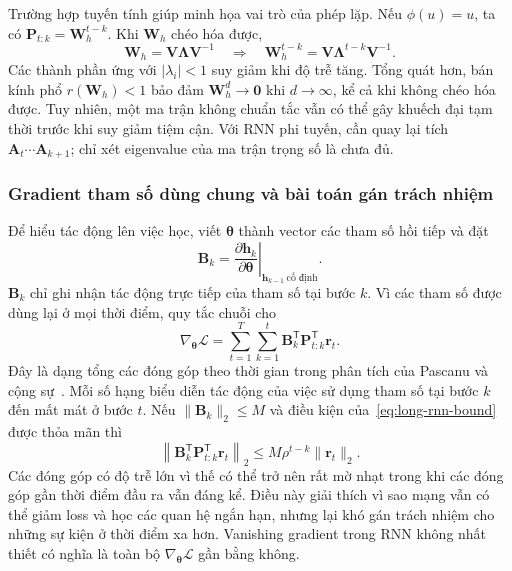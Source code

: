 \documentclass[12pt]{article}
\begin{document}
Trường hợp tuyến tính giúp minh họa vai trò của phép lặp. Nếu $\phi(u)=u$, ta có $\mathbf P_{t:k}=\mathbf W_h^{t-k}$. Khi $\mathbf W_h$ chéo hóa được,
\begin{equation}
 \mathbf W_h=\mathbf V\boldsymbol\Lambda\mathbf V^{-1}
 \quad\Longrightarrow\quad
 \mathbf W_h^{t-k}=\mathbf V\boldsymbol\Lambda^{t-k}\mathbf V^{-1}.
 \label{eq:long-rnn-eigen}
\end{equation}
Các thành phần ứng với $|\lambda_i|<1$ suy giảm khi độ trễ tăng. Tổng quát hơn, bán kính phổ $r(\mathbf W_h)<1$ bảo đảm $\mathbf W_h^d\to\mathbf0$ khi $d\to\infty$, kể cả khi không chéo hóa được. Tuy nhiên, một ma trận không chuẩn tắc vẫn có thể gây khuếch đại tạm thời trước khi suy giảm tiệm cận. Với RNN phi tuyến, cần quay lại tích $\mathbf A_t\cdots\mathbf A_{k+1}$; chỉ xét eigenvalue của ma trận trọng số là chưa đủ.

\subsubsection{Gradient tham số dùng chung và bài toán gán trách nhiệm}
Để hiểu tác động lên việc học, viết $\boldsymbol\theta$ thành vector các tham số hồi tiếp và đặt
\begin{equation}
 \mathbf B_k=\left.\frac{\partial\mathbf h_k}{\partial\boldsymbol\theta}
 \right|_{\mathbf h_{k-1}\ \text{cố định}}.
 \label{eq:long-rnn-local}
\end{equation}
$\mathbf B_k$ chỉ ghi nhận tác động trực tiếp của tham số tại bước $k$. Vì các tham số được dùng lại ở mọi thời điểm, quy tắc chuỗi cho
\begin{equation}
 \nabla_{\boldsymbol\theta}\mathcal L
 =\sum_{t=1}^{T}\sum_{k=1}^{t}
 \mathbf B_k^{\mathsf T}\mathbf P_{t:k}^{\mathsf T}\mathbf r_t.
 \label{eq:long-rnn-param}
\end{equation}
Đây là dạng tổng các đóng góp theo thời gian trong phân tích của Pascanu và cộng sự~\cite[\S1.1]{long-pascanu2013}. Mỗi số hạng biểu diễn tác động của việc sử dụng tham số tại bước $k$ đến mất mát ở bước $t$. Nếu $\|\mathbf B_k\|_2\leq M$ và điều kiện của~\eqref{eq:long-rnn-bound} được thỏa mãn thì
\begin{equation}
 \left\|\mathbf B_k^{\mathsf T}\mathbf P_{t:k}^{\mathsf T}\mathbf r_t\right\|_2
 \leq M\rho^{t-k}\|\mathbf r_t\|_2.
 \label{eq:long-rnn-term}
\end{equation}
Các đóng góp có độ trễ lớn vì thế có thể trở nên rất mờ nhạt trong khi các đóng góp gần thời điểm đầu ra vẫn đáng kể. Điều này giải thích vì sao mạng vẫn có thể giảm loss và học các quan hệ ngắn hạn, nhưng lại khó gán trách nhiệm cho những sự kiện ở thời điểm xa hơn. Vanishing gradient trong RNN không nhất thiết có nghĩa là toàn bộ $\nabla_{\boldsymbol\theta}\mathcal L$ gần bằng không.
\end{document}
